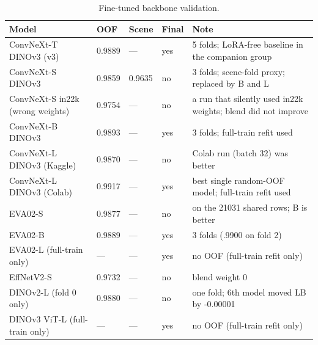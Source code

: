 \documentclass[../main.tex]{subfiles}
\begin{document}
\begin{table}[H]\centering\small
\begin{tabular}{@{}L{.30\linewidth}L{.08\linewidth}L{.08\linewidth}L{.08\linewidth}L{.36\linewidth}@{}}
\toprule
\textbf{Model} & \textbf{OOF} & \textbf{Scene} & \textbf{Final} & \textbf{Note} \\
\midrule
ConvNeXt-T DINOv3 (v3) & 0.9889 & --- & yes & 5 folds; LoRA-free baseline in the companion group \\
ConvNeXt-S DINOv3 & 0.9859 & 0.9635 & no & 3 folds; scene-fold proxy; replaced by B and L \\
ConvNeXt-S in22k (wrong weights) & 0.9754 & --- & no & a run that silently used in22k weights; blend did not improve \\
ConvNeXt-B DINOv3 & 0.9893 & --- & yes & 3 folds; full-train refit used \\
ConvNeXt-L DINOv3 (Kaggle) & 0.9870 & --- & no & Colab run (batch 32) was better \\
ConvNeXt-L DINOv3 (Colab) & 0.9917 & --- & yes & best single random-OOF model; full-train refit used \\
EVA02-S & 0.9877 & --- & no & on the 21031 shared rows; B is better \\
EVA02-B & 0.9889 & --- & yes & 3 folds (.9900 on fold 2) \\
EVA02-L (full-train only) & --- & --- & yes & no OOF (full-train refit only) \\
EffNetV2-S & 0.9732 & --- & no & blend weight 0 \\
DINOv2-L (fold 0 only) & 0.9880 & --- & no & one fold; 6th model moved LB by -0.00001 \\
DINOv3 ViT-L (full-train only) & --- & --- & yes & no OOF (full-train refit only) \\
\bottomrule
\end{tabular}
\caption{Fine-tuned backbone validation.}\label{tab:t4-backbones-ft}
\end{table}
\end{document}
